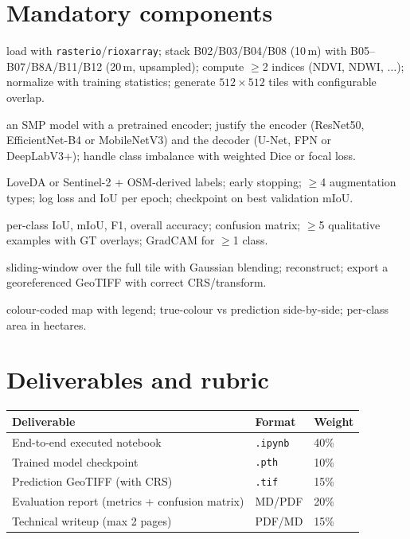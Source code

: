 \section{Mandatory components}

\begin{description}[leftmargin=1.6em,style=nextline]
  \item[Data pipeline] load with \texttt{rasterio}/\texttt{rioxarray}; stack
  B02/B03/B04/B08 (10\,m) with B05--B07/B8A/B11/B12 (20\,m, upsampled); compute
  $\geq$2 indices (NDVI, NDWI, $\dots$); normalize with training statistics;
  generate $512\times512$ tiles with configurable overlap.
  \item[Model]   an SMP model with a pretrained encoder; justify the encoder
  (ResNet50, EfficientNet-B4 or MobileNetV3) and the decoder (U-Net, FPN or
  DeepLabV3+);
  handle class imbalance with weighted Dice or focal loss.
  \item[Training] LoveDA or Sentinel-2 + OSM-derived labels; early stopping;
  $\geq$4 augmentation types; log loss and IoU per epoch; checkpoint on best
  validation mIoU.
  \item[Evaluation] per-class IoU, mIoU, F1, overall accuracy; confusion matrix;
  $\geq$5 qualitative examples with GT overlays; GradCAM for $\geq$1 class.
  \item[Inference] sliding-window over the full tile with Gaussian blending;
  reconstruct; export a georeferenced GeoTIFF with correct CRS/transform.
  \item[Visualisation] colour-coded map with legend; true-colour vs prediction
  side-by-side; per-class area in hectares.
\end{description}

\section{Deliverables and rubric}

\begin{center}\small
\renewcommand{\arraystretch}{1.15}
\begin{tabular}{@{}lll@{}}
\toprule
Deliverable & Format & Weight\\
\midrule
End-to-end executed notebook & \texttt{.ipynb} & 40\%\\
Trained model checkpoint & \texttt{.pth} & 10\%\\
Prediction GeoTIFF (with CRS) & \texttt{.tif} & 15\%\\
Evaluation report (metrics + confusion matrix) & MD/PDF & 20\%\\
Technical writeup (max 2 pages) & PDF/MD & 15\%\\
\bottomrule
\end{tabular}
\end{center}

